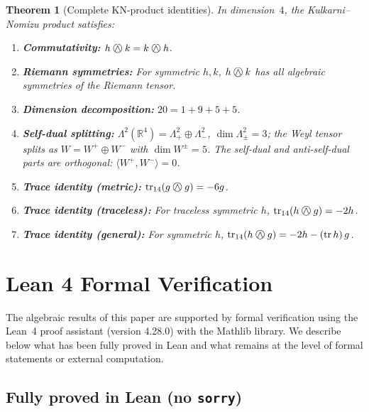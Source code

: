 \documentclass[11pt,a4paper]{article}
\newcommand{\owedge}{\mathbin{%
  \text{%
    \ooalign{%
      \hfil$\wedge$\hfil\cr
      \hfil\raisebox{0.05em}{$\bigcirc$}\hfil\cr
    }%
  }%
}}
\newtheorem{theorem}{Theorem}[section]
\begin{document}
\begin{theorem}[Complete KN-product identities]
\label{thm:kn_identities}
In dimension~$4$, the Kulkarni--Nomizu product satisfies:
\begin{enumerate}[label=(\roman*)]
  \item \textbf{Commutativity:} $h \owedge k = k \owedge h$.
  \item \textbf{Riemann symmetries:} For symmetric $h, k$,
    $h \owedge k$ has all algebraic symmetries of the Riemann tensor.
  \item \textbf{Dimension decomposition:} $20 = 1 + 9 + 5 + 5$.
  \item \textbf{Self-dual splitting:}
    $\Lambda^2(\mathbb{R}^4) = \Lambda^2_+ \oplus \Lambda^2_-$,
    $\dim \Lambda^2_\pm = 3$; the Weyl tensor splits as
    $W = W^+ \oplus W^-$ with $\dim W^\pm = 5$.
    The self-dual and anti-self-dual parts are orthogonal:
    $\langle W^+, W^- \rangle = 0$.
  \item \textbf{Trace identity (metric):}
    $\operatorname{tr}_{14}(g \owedge g) = -6g$.
  \item \textbf{Trace identity (traceless):} For traceless symmetric $h$,
    $\operatorname{tr}_{14}(h \owedge g) = -2h$.
  \item \textbf{Trace identity (general):} For symmetric $h$,
    $\operatorname{tr}_{14}(h \owedge g) = -2h - (\operatorname{tr}h)\,g$.
\end{enumerate}
\end{theorem}

\section{Lean 4 Formal Verification}
\label{sec:lean}

The algebraic results of this paper are supported by formal verification
using the Lean~4 proof assistant (version 4.28.0) with the Mathlib
library. We describe below what has been fully proved in Lean and what
remains at the level of formal statements or external computation.

\subsection{Fully proved in Lean (no \texttt{sorry})}
\end{document}
